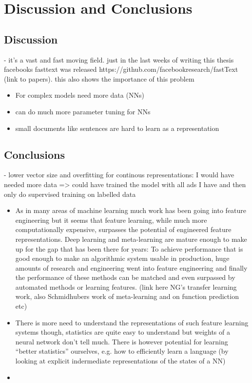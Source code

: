 
\clearpage
\section{Discussion and Conclusions}

\subsection{Discussion}

- it's a vast and fast moving field. just in the last weeks of writing this thesis facebooks fasttext was released https://github.com/facebookresearch/fastText (link to papers). this also shows the importance of this problem

\begin{itemize}
  \item For complex models need more data (NNs)
  \item can do much more parameter tuning for NNs
  \item small documents like sentences are hard to learn as a representation
\end{itemize}

\subsection{Conclusions}
\label{subs:conclusions}

- lower vector size and overfitting for continous representations: I would have needed more data => could have trained the model with all ads I have and then only do supervised training on labelled data

\begin{itemize}
  \item As in many areas of machine learning much work has been going into feature engineering but it seems that feature learning, while much more computationally expensive, surpasses the potential of engineered feature representations. Deep learning and meta-learning are mature enough to make up for the gap that has been there for years: To achieve performance that is good enough to make an algorithmic system usable in production, huge amounts of research and engineering went into feature engineering and finally the performance of these methods can be matched and even surpassed by automated methods or learning features. (link here NG's transfer learning work, also Schmidhubers work of meta-learning and on function prediction etc)
  \item There is more need to understand the representations of such feature learning systems though, statistics are quite easy to understand but weights of a neural network don't tell much. There is however potential for learning ``better statistics'' ourselves, e.g. how to efficiently learn a language (by looking at explicit indermediate representations of the states of a NN)
  \item
\end{itemize}


